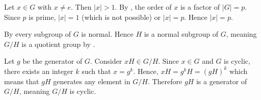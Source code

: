 \begin{questions}
    \item Let $x \in G$ with $x \neq e$. Then $|x| > 1$. By , the order of $x$ is a factor of $|G| = p$. Since $p$ is prime, $|x| = 1$ (which is not possible) or $|x| = p$. Hence $|x| = p$.

    \item \begin{partquestions}{\roman*}
        \item By  every subgroup of $G$ is normal. Hence $H$ is a normal subgroup of $G$, meaning $G/H$ is a quotient group by .
        
        \item Let $g$ be the generator of $G$. Consider $xH \in G/H$. Since $x \in G$ and $G$ is cyclic, there exists an integer $k$ such that $x = g^k$. Hence, $xH = g^kH = (gH)^k$ which means that $gH$ generates any element in $G/H$. Therefore $gH$ is a generator of $G/H$, meaning $G/H$ is cyclic.
    \end{partquestions}
\end{questions}

